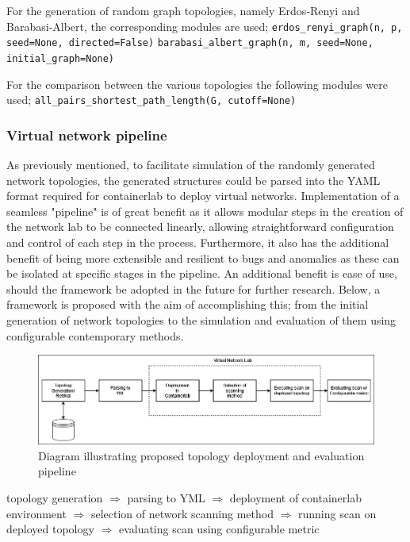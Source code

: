 For the generation of random graph topologies, namely Erdos-Renyi and Barabasi-Albert, the corresponding modules are used; \newline
\verb|erdos_renyi_graph(n, p, seed=None, directed=False)| 
\verb|barabasi_albert_graph(n, m, seed=None, initial_graph=None)| 

For the comparison between the various topologies the following modules were used; \newline 
\verb|all_pairs_shortest_path_length(G, cutoff=None)|

\subsubsection{Virtual network pipeline}
As previously mentioned, to facilitate simulation of the randomly generated network topologies, the generated structures could be parsed into the YAML format required for containerlab to deploy virtual networks. Implementation of a seamless "pipeline" is of great benefit as it allows modular steps in the creation of the network lab to be connected linearly, allowing straightforward configuration and control of each step in the process. Furthermore, it also has the additional benefit of being more extensible and resilient to bugs and anomalies as these can be isolated at specific stages in the pipeline. An additional benefit is ease of use, should the framework be adopted in the future for further research. Below, a framework is proposed with the aim of accomplishing this; from the initial generation of network topologies to the simulation and evaluation of them using configurable contemporary methods. 

\begin{figure}
    \centering
    \includegraphics[width=0.9\linewidth]{images/topo_pipeline.png}
    \caption{Diagram illustrating proposed topology deployment and evaluation pipeline}
    \label{fig:topo_pipe}
\end{figure}

topology generation $\Rightarrow$ parsing to YML $\Rightarrow$ deployment of containerlab environment $\Rightarrow$ selection of network scanning method $\Rightarrow$ running scan on deployed topology $\Rightarrow$ evaluating scan using configurable metric 

